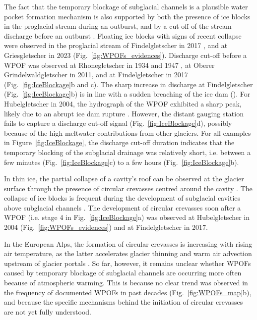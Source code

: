 The fact that the temporary blockage of subglacial channels is a plausible water pocket formation mechanism is also supported by both the presence of ice blocks in the proglacial stream during an outburst, and by a cut-off of the stream discharge before an outburst \citep[e.g.][]{Ballantyne&McGann1980}. Floating ice blocks with signs of recent collapse were observed in the proglacial stream of Findelgletscher in 2017 \citep{Swift&al2021}, and at Griesgletscher in 2023 (Fig.~\ref{fig:WPOFs_evidences}). Discharge cut-off before a WPOF was observed at Rhonegletscher in 1934 \citep{Mercanton1935} and 1947 \citep{Mercanton1948}, at Oberer Grindelwaldgletscher in 2011, and at Findelgletscher in 2017 (Fig.~\ref{fig:IceBlockage}b and c). The sharp increase in discharge at Findelgletscher (Fig.~\ref{fig:IceBlockage}b) is in line with a sudden breaching of the ice dam (\cite{Haeberli1983}). For Hubelgletscher in 2004, the hydrograph of the WPOF exhibited a sharp peak, likely due to an abrupt ice dam rupture \citep{fink2004}. However, the distant gauging station fails to capture a discharge cut-off signal (Fig.~\ref{fig:IceBlockage}d), possibly because of the high meltwater contributions from other glaciers. For all examples in Figure~\ref{fig:IceBlockage}, the discharge cut-off duration indicates that the temporary blocking of the subglacial drainage was relatively short, i.e. between a few minutes (Fig.~\ref{fig:IceBlockage}c) to a few hours (Fig.~\ref{fig:IceBlockage}b). 

In thin ice, the partial collapse of a cavity's roof can be observed at the glacier surface through the presence of circular crevasses centred around the cavity \citep[e.g.][]{Egli&al2021, Ruols&al2024}. The collapse of ice blocks is frequent during the development of subglacial cavities above subglacial channels \citep{Egli&al2021, Ogier&al2022}. The development of circular crevasses soon after a WPOF (i.e. stage 4 in Fig.~\ref{fig:IceBlockage}a) was observed at Hubelgletscher in 2004 (Fig.~\ref{fig:WPOFs_evidences}) and at Findelgletscher in 2017. 

In the European Alps, the formation of circular crevasses is increasing with rising air temperature, as the latter accelerates glacier thinning and warm air advection upstream of glacier portals \citep{Stocker&al2017,Egli&al2021}. So far, however, it remains unclear whether WPOFs caused by temporary blockage of subglacial channels are occurring more often because of atmospheric warming. This is because no clear trend was observed in the frequency of documented WPOFs in past decades (Fig.~\ref{fig:WPOFs_map}b), and because the specific mechanisms behind the initiation of circular crevasses are not yet fully understood.

